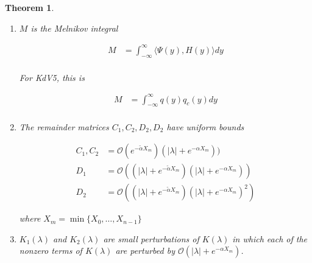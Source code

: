 \documentclass[12pt]{article}
\newtheorem{theorem}{Theorem}
\begin{document}
\begin{theorem}
\begin{enumerate}
\begin{equation}\label{defKlambda}
K(\lambda) = 
\begin{pmatrix}
e^{-\nu(\lambda)X_1} & & & & & -e^{\nu(\lambda)X_0} \\
-e^{\nu(\lambda)X_1} & e^{-\nu(\lambda)X_2} \\
& -e^{\nu(\lambda)X_2} & e^{-\nu(\lambda)X_3} \\
\vdots & & \vdots & &&  \vdots \\
& & & & -e^{\nu(\lambda)X_{n-1}} & e^{-\nu(\lambda)X_0} 
\end{pmatrix}
\end{equation}

where $\nu(\lambda)$ is the small eigenvalue of the asymptotic matrix $A(0; \lambda)$ as defined above.

\item $M$ is the Melnikov integral

\begin{align*}
M &= \int_{-\infty}^\infty \langle \Psi(y), H(y) \rangle dy \\
\end{align*}

For KdV5, this is

\begin{align*}
M &= \int_{-\infty}^\infty q(y) q_c(y) dy \\
\end{align*}

\item The remainder matrices $C_1, C_2, D_2, D_2$ have uniform bounds

\begin{align*}
C_1, C_2 &= \mathcal{O}(e^{-\tilde{\alpha}X_m})(|\lambda| + e^{-\alpha X_m})) \\
D_1 &= \mathcal{O}((|\lambda| + e^{-\tilde{\alpha} X_m})(|\lambda| + e^{-\alpha X_m})) \\
D_2 &= \mathcal{O}((|\lambda| + e^{-\tilde{\alpha} X_m})(|\lambda| + e^{-\alpha X_m})^2)
\end{align*}

where $X_m = \min \{X_0, \dots, X_{n-1}\}$

\item $K_1(\lambda)$ and $K_2(\lambda)$ are small perturbations of $K(\lambda)$ in which each of the nonzero terms of $K(\lambda)$ are perturbed by $\mathcal{O}(|\lambda| + e^{-\alpha X_m})$.

\end{enumerate}
\end{theorem}
\end{document}

